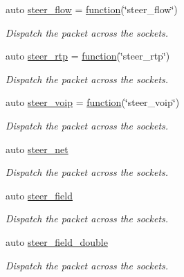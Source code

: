 \begin{DoxyCompactItemize}
auto \hyperlink{namespacepfq_1_1lang_1_1anonymous__namespace_02default_8hpp_03_adeb44c976ac903e7b13addb65ac41f9f}{steer\+\_\+flow} = \hyperlink{namespacepfq_1_1lang_a1a4638059d700ae08d0ca63886ff2bb3}{function}(\char`\"{}steer\+\_\+flow\char`\"{})
\begin{DoxyCompactList}\small\item\em Dispatch the packet across the sockets. \end{DoxyCompactList}\item 
auto \hyperlink{namespacepfq_1_1lang_1_1anonymous__namespace_02default_8hpp_03_ac3bc5ec07d93fa5d9266e0e08191fe22}{steer\+\_\+rtp} = \hyperlink{namespacepfq_1_1lang_a1a4638059d700ae08d0ca63886ff2bb3}{function}(\char`\"{}steer\+\_\+rtp\char`\"{})
\begin{DoxyCompactList}\small\item\em Dispatch the packet across the sockets. \end{DoxyCompactList}\item 
auto \hyperlink{namespacepfq_1_1lang_1_1anonymous__namespace_02default_8hpp_03_a50fa612c45aa8f8dfd3259e2d0cbfce0}{steer\+\_\+voip} = \hyperlink{namespacepfq_1_1lang_a1a4638059d700ae08d0ca63886ff2bb3}{function}(\char`\"{}steer\+\_\+voip\char`\"{})
\begin{DoxyCompactList}\small\item\em Dispatch the packet across the sockets. \end{DoxyCompactList}\item 
auto \hyperlink{namespacepfq_1_1lang_1_1anonymous__namespace_02default_8hpp_03_a6f8d514e40bb2b0e874fb26d2b416dc3}{steer\+\_\+net}
\begin{DoxyCompactList}\small\item\em Dispatch the packet across the sockets. \end{DoxyCompactList}\item 
auto \hyperlink{namespacepfq_1_1lang_1_1anonymous__namespace_02default_8hpp_03_ad861e297a10876e534c5c9053ec23999}{steer\+\_\+field}
\begin{DoxyCompactList}\small\item\em Dispatch the packet across the sockets. \end{DoxyCompactList}\item 
auto \hyperlink{namespacepfq_1_1lang_1_1anonymous__namespace_02default_8hpp_03_aabbf7feb753f3c5b1b40cfa8a54581e5}{steer\+\_\+field\+\_\+double}
\begin{DoxyCompactList}\small\item\em Dispatch the packet across the sockets. \end{DoxyCompactList}\item 

\end{DoxyCompactItemize}
